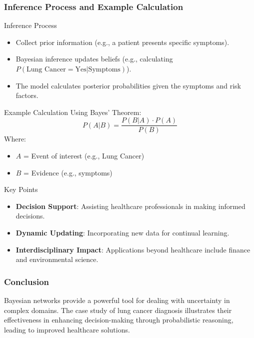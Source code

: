 \documentclass[aspectratio=169]{beamer}
\begin{document}
\begin{frame}[fragile]
    \frametitle{Inference Process and Example Calculation}
    \begin{block}{Inference Process}
        \begin{itemize}
            \item Collect prior information (e.g., a patient presents specific symptoms).
            \item Bayesian inference updates beliefs (e.g., calculating $P(\text{Lung Cancer} = \text{Yes} | \text{Symptoms})$).
            \item The model calculates posterior probabilities given the symptoms and risk factors.
        \end{itemize}
    \end{block}

    \begin{block}{Example Calculation}
        Using Bayes' Theorem:
        \begin{equation}
            P(A|B) = \frac{P(B|A) \cdot P(A)}{P(B)}
        \end{equation}
        Where:
        \begin{itemize}
            \item $A$ = Event of interest (e.g., Lung Cancer)
            \item $B$ = Evidence (e.g., symptoms)
        \end{itemize}
    \end{block}

    \begin{block}{Key Points}
        \begin{itemize}
            \item \textbf{Decision Support}: Assisting healthcare professionals in making informed decisions.
            \item \textbf{Dynamic Updating}: Incorporating new data for continual learning.
            \item \textbf{Interdisciplinary Impact}: Applications beyond healthcare include finance and environmental science.
        \end{itemize}
    \end{block}
\end{frame}

\begin{frame}[fragile]
    \frametitle{Conclusion}
    Bayesian networks provide a powerful tool for dealing with uncertainty in complex domains. The case study of lung cancer diagnosis illustrates their effectiveness in enhancing decision-making through probabilistic reasoning, leading to improved healthcare solutions.
\end{frame}
\end{document}
